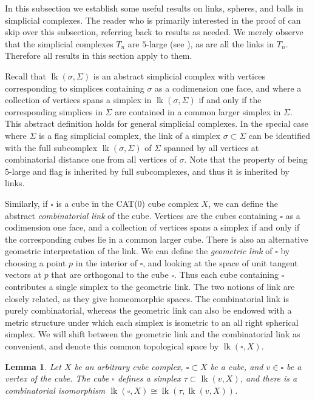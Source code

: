\documentclass[12pt, letterpaper]{article}
\newcommand{\lk}{\operatorname{lk}}
\theoremstyle{plain}
\newtheorem{lem}[thm]{Lemma}
\theoremstyle{definition}
\begin{document}
In this subsection we establish some useful results on links, spheres, and balls in simplicial complexes. The reader who is primarily interested in the proof of  can skip over this subsection, referring back to results as needed. We merely observe that the simplicial complexes $T_n$ are $5$-large (see ), as are all the links in $T_n$. Therefore all results in this section apply to them.

\medskip

Recall that $\lk(\sigma, \Sigma)$ is an abstract simplicial complex with vertices corresponding to simplices containing $\sigma$ as a codimension one face, and where a collection of vertices spans a simplex in $\lk(\sigma, \Sigma)$ if and only if the corresponding simplices in $\Sigma$ are contained in a common larger simplex in $\Sigma$. This abstract definition holds for general simplicial complexes. In the special case where $\Sigma$ is a flag simplicial complex, the link of a simplex $\sigma \subset \Sigma$ can be identified with the full subcomplex $\lk(\sigma, \Sigma)$ of $\Sigma$ spanned by all vertices at combinatorial distance one from all vertices of $\sigma$. Note that the property of being $5$-large and flag is inherited by full subcomplexes, and thus it is inherited by links.

Similarly, if $\square$ is a cube in the CAT(0) cube complex $X$, we can define the abstract \emph{combinatorial link} of the cube. Vertices are the cubes containing $\square$ as a codimension one face, and a collection of vertices spans a simplex if and only if the corresponding cubes lie in a common larger cube. There is also an alternative geometric interpretation of the link. We can define the \emph{geometric link} of $\square$ by choosing a point $p$ in the interior of $\square$, and looking at the space of unit tangent vectors at $p$ that are orthogonal to the cube $\square$. Thus each cube containing $\square$ contributes a single simplex to the geometric link. The two notions of link are closely related, as they give homeomorphic spaces. The combinatorial link is purely combinatorial, whereas the geometric link can also be endowed with a metric structure under which each simplex is isometric to an all right spherical simplex. We will shift between the geometric link and the combinatorial link as convenient, and denote this common topological space by ${\lk}(\square, X)$.

\begin{lem}\label{lem:links-cube-to-vertex}
    Let $X$ be an arbitrary cube complex, $\square \subset X$ be a cube, and $v\in \square$ be a vertex of the cube. The cube $\square$ defines a simplex $\tau \subset \lk(v,X)$, and there is a combinatorial isomorphism $\lk(\square, X) \cong \lk(\tau, \lk(v,X))$.
\end{lem}
\end{document}
